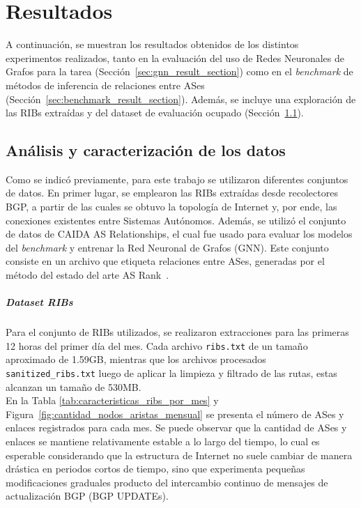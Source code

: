 ﻿\chapter{Resultados}

A continuación, se muestran los resultados obtenidos de los distintos experimentos realizados, tanto en la evaluación del uso de Redes Neuronales de Grafos para la tarea (Sección~\ref{sec:gnn_result_section}) como en el \textit{benchmark} de métodos de inferencia de relaciones entre ASes (Sección~\ref{sec:benchmark_result_section}). Además, se incluye una exploración de las RIBs extraídas y del dataset de evaluación ocupado (Sección~\ref{sec:analisis_datasets_section}).\\



\section{Análisis y caracterización de los datos} \label{sec:analisis_datasets_section}

Como se indicó previamente, para este trabajo se utilizaron diferentes conjuntos de datos. En primer lugar, se emplearon las RIBs extraídas desde recolectores BGP, a partir de las cuales se obtuvo la topología de Internet y, por ende, las conexiones existentes entre Sistemas Autónomos. Además, se utilizó el conjunto de datos de CAIDA AS Relationships, el cual fue usado para evaluar los modelos del \textit{benchmark} y entrenar la Red Neuronal de Grafos (GNN). Este conjunto consiste en un archivo que etiqueta relaciones entre ASes, generadas por el método del estado del arte AS Rank~\cite{ASRank}.\\


\paragraph{Dataset RIBs}

Para el conjunto de RIBs utilizados, se realizaron extracciones para las primeras 12 horas del primer día del mes. Cada archivo \texttt{ribs.txt} de un tamaño aproximado de 1.59GB, mientras que los archivos procesados \texttt{sanitized\_ribs.txt} luego de aplicar la limpieza y filtrado de las rutas, estas alcanzan un tamaño de 530MB.\\

En la Tabla \ref{tab:caracteristicas_ribs_por_mes} y Figura~\ref{fig:cantidad_nodos_aristas_mensual} se presenta el número de ASes y enlaces registrados para cada mes. Se puede observar que la cantidad de ASes y enlaces se mantiene relativamente estable a lo largo del tiempo, lo cual es esperable considerando que la estructura de Internet no suele cambiar de manera drástica en periodos cortos de tiempo, sino que experimenta pequeñas modificaciones graduales  producto del intercambio continuo de mensajes de actualización BGP (BGP UPDATEs).\\

